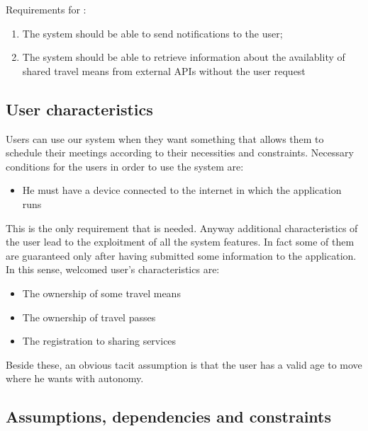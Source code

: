 Requirements for :
\begin{enumerate}[resume]
\renewcommand\labelenumi{\textbf{R\theenumi}}
\item The system should be able to send notifications to the user;
\item The system should be able to retrieve information about the availablity of shared travel means from external APIs without the user request 
\end{enumerate}


\subsection{User characteristics}
Users can use our system when they want something that allows them to schedule their meetings according to their necessities and constraints. Necessary conditions for the users in order to use the system are: 

\begin{itemize}
\item He must have a device connected to the internet in which the application runs
\end{itemize}

This is the only requirement that is needed. Anyway additional characteristics of the user lead to the exploitment of all the system features. In fact some of them are guaranteed only after having submitted some information to the application.
In this sense, welcomed user's characteristics are:

\begin{itemize}
\item The ownership of some travel means
\item The ownership of travel passes
\item The registration to sharing services
\end{itemize}

Beside these, an obvious tacit assumption is that the user has a valid age to move where he wants with autonomy.


\subsection{ Assumptions, dependencies and constraints}

